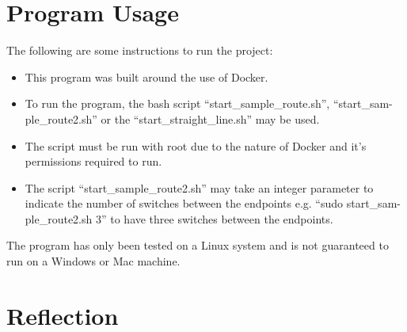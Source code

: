 \documentclass{article}
\begin{document}
\section{Program Usage}
The following are some instructions to run the project:
\begin{itemize}
  \item{This program was built around the use of Docker.}
  \item{To run the program, the bash script ``start\_sample\_route.sh'',
    ``start\_sam-\\ple\_route2.sh'' or the ``start\_straight\_line.sh'' may be
  used.}
  \item{The script must be run with root due to the nature of Docker and it's
    permissions required to run.}
  \item{The script ``start\_sample\_route2.sh'' may take an integer parameter
    to indicate the number of switches between the endpoints e.g. ``sudo
  start\_sam-\\ple\_route2.sh 3'' to have three switches between the endpoints.}
\end{itemize}

The program has only been tested on a Linux system and is not guaranteed to run
on a Windows or Mac machine.

\section{Reflection}
\end{document}
